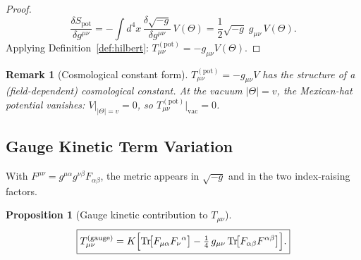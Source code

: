 \documentclass[12pt]{article}
\newtheorem{proposition}[definition]{Proposition}
\newtheorem{remark}[definition]{Remark}
\newcommand{\Tr}{\mathrm{Tr}}
\begin{document}
\begin{proof}
\begin{equation}
  \frac{\delta S_{\mathrm{pot}}}{\delta g^{\mu\nu}}
  = -\int d^4x\,\frac{\delta\sqrt{-g}}{\delta g^{\mu\nu}}\,V(\Theta)
  = \frac{1}{2}\sqrt{-g}\;g_{\mu\nu}\,V(\Theta).
\end{equation}
Applying Definition~\ref{def:hilbert}: $T^{(\mathrm{pot})}_{\mu\nu} = -g_{\mu\nu}V(\Theta)$.
\end{proof}

\begin{remark}[Cosmological constant form]
$T^{(\mathrm{pot})}_{\mu\nu} = -g_{\mu\nu}V$ has the structure of a
(field-dependent) cosmological constant.  At the vacuum $|\Theta|=v$,
the Mexican-hat potential vanishes: $V|_{|\Theta|=v}=0$, so
$T^{(\mathrm{pot})}_{\mu\nu}|_{\mathrm{vac}}=0$.
\end{remark}

\subsection{Gauge Kinetic Term Variation}

With $F^{\mu\nu} = g^{\mu\alpha}g^{\nu\beta}F_{\alpha\beta}$, the metric
appears in $\sqrt{-g}$ and in the two index-raising factors.

\begin{proposition}[Gauge kinetic contribution to $T_{\mu\nu}$]
\label{prop:T_gauge}
\begin{equation}
  \label{eq:T_gauge}
  \boxed{
    T^{(\mathrm{gauge})}_{\mu\nu}
    = K\Bigl[
        \Tr\!\bigl[F_{\mu\alpha}F_\nu{}^{\alpha}\bigr]
        - \tfrac{1}{4}\,g_{\mu\nu}\,\Tr\!\bigl[F_{\alpha\beta}F^{\alpha\beta}\bigr]
      \Bigr].
  }
\end{equation}
\end{proposition}
\end{document}
